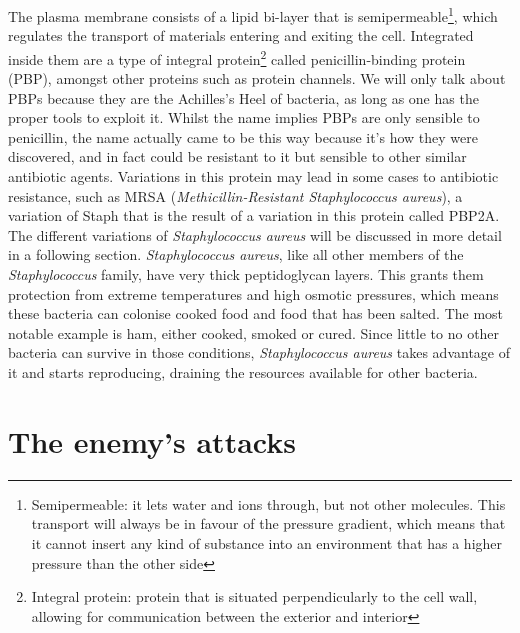 The plasma membrane consists of a lipid bi-layer that is semipermeable\footnote{Semipermeable: it lets water and ions through, but not other molecules. This transport will always be in favour of the pressure gradient, which means that it cannot insert any kind of substance into an environment that has a higher pressure than the other side}, which regulates the transport of materials entering and exiting the cell. Integrated inside them are a type of integral protein\footnote{Integral protein: protein that is situated perpendicularly to the cell wall, allowing for communication between the exterior and interior} called penicillin-binding protein (PBP), amongst other  proteins such as protein channels. We will only talk about PBPs because they are the Achilles's Heel of bacteria, as long as one has the proper tools to exploit it. Whilst the name implies PBPs are only sensible to penicillin, the name actually came to be this way because it's how they were discovered, and in fact could be resistant to it but sensible to other similar antibiotic agents. Variations in this protein may lead in some cases to antibiotic resistance, such as MRSA (\emph{Methicillin-Resistant \emph{Staphylococcus aureus}}), a variation of Staph that is the result of a variation in this protein called PBP2A\cite{kongTargetingStaphylococcusAureus2016}. The different variations of \emph{Staphylococcus aureus} will be discussed in more detail in a following section. \newline
\emph{Staphylococcus aureus}, like all other members of the \emph{Staphylococcus} family, have very thick peptidoglycan layers. This grants them protection from extreme temperatures and high osmotic pressures, which means these bacteria can colonise cooked food and food that has been salted. The most notable example is ham, either cooked, smoked or cured. Since little to no other bacteria can survive in those conditions, \emph{Staphylococcus aureus} takes advantage of it and starts reproducing, draining the resources available for other bacteria.
\section{The enemy's attacks}
